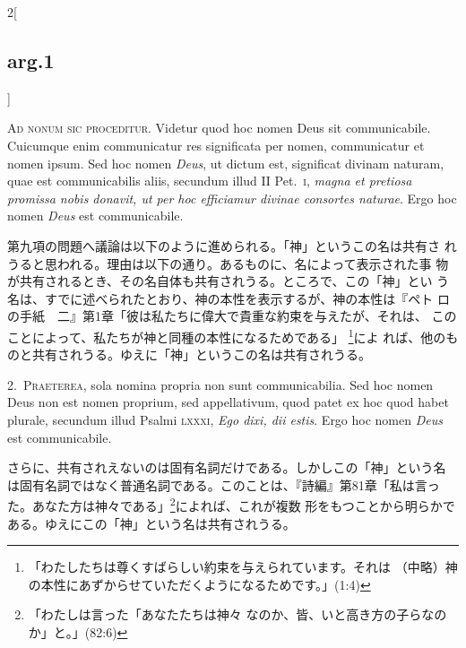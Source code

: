 \documentclass[paper=a4paper,fontsize=10pt,jafontsize=9pt,titlepage]{jlreq}
\begin{document}
\begin{paracol}{2}[\subsection{arg.1}]

{\huge A}{\scshape d nonum sic proceditur}. Videtur quod hoc nomen
Deus sit communicabile. Cuicumque enim communicatur res significata
per nomen, communicatur et nomen ipsum. Sed hoc nomen {\itshape Deus},
ut dictum est, significat divinam naturam, quae est communicabilis
aliis, secundum illud II Pet.~{\scshape i}, {\itshape magna et
pretiosa promissa nobis donavit, ut per hoc efficiamur divinae
consortes naturae}. Ergo hoc nomen {\itshape Deus} est communicabile.

\switchcolumn

第九項の問題へ議論は以下のように進められる。「神」というこの名は共有さ
れうると思われる。理由は以下の通り。あるものに、名によって表示された事
物が共有されるとき、その名自体も共有されうる。ところで、この「神」とい
う名は、すでに述べられたとおり、神の本性を表示するが、神の本性は『ペト
ロの手紙　二』第1章「彼は私たちに偉大で貴重な約束を与えたが、それは、
このことによって、私たちが神と同種の本性になるためである」
\footnote{「わたしたちは尊くすばらしい約束を与えられています。それは
（中略）神の本性にあずからせていただくようになるためです。」(1:4)}によ
れば、他のものと共有されうる。ゆえに「神」というこの名は共有されうる。


2.~{\scshape Praeterea}, sola nomina propria non sunt
communicabilia. Sed hoc nomen Deus non est nomen proprium, sed
appellativum, quod patet ex hoc quod habet plurale, secundum illud
Psalmi {\scshape lxxxi}, {\itshape Ego dixi, dii estis}. Ergo hoc
nomen {\itshape Deus} est communicabile.

\switchcolumn

さらに、共有されえないのは固有名詞だけである。しかしこの「神」という名
は固有名詞ではなく普通名詞である。このことは、『詩編』第81章「私は言っ
た。あなた方は神々である」\footnote{「わたしは言った「あなたたちは神々
なのか、皆、いと高き方の子らなのか」と。」(82:6)}によれば、これが複数
形をもつことから明らかである。ゆえにこの「神」という名は共有されうる。



\end{paracol}
\end{document}
